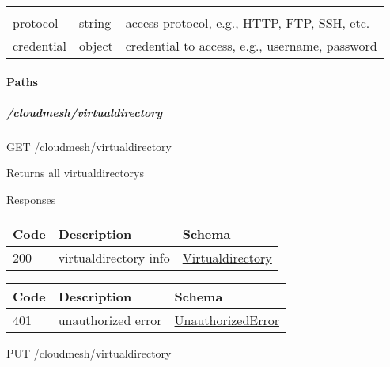 \documentclass[9pt,]{article}
\let\oldparagraph\paragraph
\renewcommand{\paragraph}[1]{\oldparagraph{#1}\mbox{}}
\let\oldsubparagraph\subparagraph
\renewcommand{\subparagraph}[1]{\oldsubparagraph{#1}\mbox{}}
\begin{document}
\begin{longtable}[]{@{}lll@{}}
\begin{minipage}[t]{0.58\columnwidth}
\end{minipage}\tabularnewline
\begin{minipage}[t]{0.17\columnwidth}\raggedright
protocol\strut
\end{minipage} & \begin{minipage}[t]{0.14\columnwidth}\raggedright
string\strut
\end{minipage} & \begin{minipage}[t]{0.58\columnwidth}\raggedright
access protocol, e.g., HTTP, FTP, SSH, etc.\strut
\end{minipage}\tabularnewline
\begin{minipage}[t]{0.17\columnwidth}\raggedright
credential\strut
\end{minipage} & \begin{minipage}[t]{0.14\columnwidth}\raggedright
object\strut
\end{minipage} & \begin{minipage}[t]{0.58\columnwidth}\raggedright
credential to access, e.g., username, password\strut
\end{minipage}\tabularnewline
\bottomrule
\end{longtable}

\hypertarget{paths-8}{%
\paragraph{Paths}\label{paths-8}}

\hypertarget{cloudmeshvirtualdirectory}{%
\subparagraph{/cloudmesh/virtualdirectory}\label{cloudmeshvirtualdirectory}}

GET /cloudmesh/virtualdirectory

Returns all virtualdirectorys

Responses

\begin{longtable}[]{@{}lll@{}}
\toprule
Code & Description & Schema\tabularnewline
\midrule
\endhead
200 & virtualdirectory info &
\protect\hyperlink{virtualdirectory}{Virtualdirectory}\tabularnewline
\bottomrule
\end{longtable}

\begin{longtable}[]{@{}lll@{}}
\toprule
Code & Description & Schema\tabularnewline
\midrule
\endhead
401 & unauthorized error &
\protect\hyperlink{unauthorizederror}{UnauthorizedError}\tabularnewline
\bottomrule
\end{longtable}

PUT /cloudmesh/virtualdirectory
\end{document}
